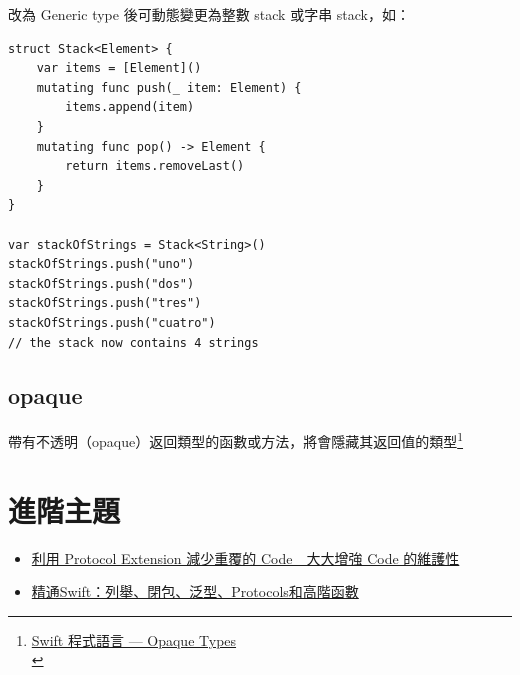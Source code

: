 \documentclass[a4paper,12pt]{article}
\begin{document}
\begin{enumerate}
改為 Generic type 後可動態變更為整數 stack 或字串 stack，如：\\
\lstset{breaklines=true,language=swift,label= ,caption= ,captionpos=b,firstnumber=1,numbers=left}
\begin{lstlisting}
struct Stack<Element> {
    var items = [Element]()
    mutating func push(_ item: Element) {
        items.append(item)
    }
    mutating func pop() -> Element {
        return items.removeLast()
    }
}

var stackOfStrings = Stack<String>()
stackOfStrings.push("uno")
stackOfStrings.push("dos")
stackOfStrings.push("tres")
stackOfStrings.push("cuatro")
// the stack now contains 4 strings

\end{lstlisting}
\end{enumerate}

\subsection{opaque}
\label{sec:org12368b0}
帶有不透明（opaque）返回類型的函數或方法，將會隱藏其返回值的類型\footnote{\href{https://medium.com/jeremy-xue-s-blog/swift-\%E7\%A8\%8B\%E5\%BC\%8F\%E8\%AA\%9E\%E8\%A8\%80-opaque-types-600ad5758b91}{Swift 程式語言 — Opaque Types}\\}\\

\section{進階主題}
\label{sec:org4447677}
\begin{itemize}
\item \href{https://www.appcoda.com.tw/protocol-extension/}{利用 Protocol Extension 減少重覆的 Code　大大增強 Code 的維護性}\\
\item \href{https://appcoda.com.tw/mastering-swift/}{精通Swift：列舉、閉包、泛型、Protocols和高階函數}\\
\end{itemize}
\end{document}
